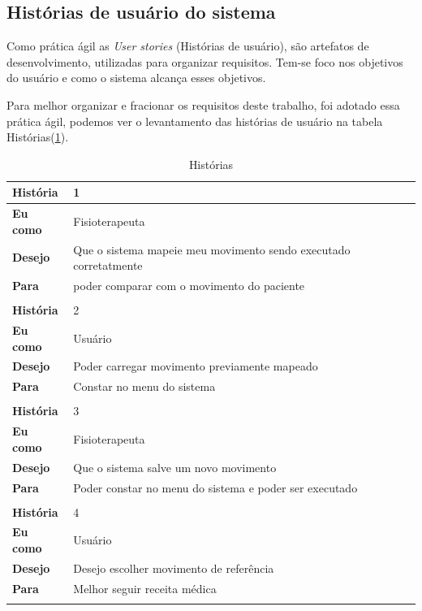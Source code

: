 \subsection{Histórias de usuário do sistema}
\label{sec:Histórias de usuário}
  Como prática ágil as \textit{User stories} (Histórias de usuário), são artefatos
de desenvolvimento, utilizadas para organizar requisitos. Tem-se foco nos objetivos
do usuário e como o sistema alcança esses objetivos.

  Para melhor organizar e fracionar os requisitos deste trabalho, foi adotado
essa prática ágil, podemos ver o levantamento das histórias de usuário na tabela Histórias(\ref{historias}).
\begin{table}[H]
\centering
\caption{Histórias}
\label{historias}
\begin{tabular}{|l|l|}
\hline
\textbf{História} & 1                                                        \\ \hline
\textbf{Eu como}  & Fisioterapeuta                    \\ \hline
\textbf{Desejo}   & Que o sistema mapeie meu movimento sendo executado corretatmente                   \\ \hline
\textbf{Para}     & poder comparar com o movimento do paciente \\ \hline
 \multicolumn{2}{|l|}{}                                                       \\ \hline
\textbf{História} & 2                                                        \\ \hline
\textbf{Eu como}  & Usuário                                    \\ \hline
\textbf{Desejo}   & Poder carregar movimento previamente mapeado                \\ \hline
\textbf{Para}     & Constar no menu do sistema\\ \hline
\multicolumn{2}{|l|}{}                                                       \\ \hline
\textbf{História} & 3                                                        \\ \hline
\textbf{Eu como}  & Fisioterapeuta                    \\ \hline
\textbf{Desejo}   & Que o sistema salve um novo movimento                    \\ \hline
\textbf{Para}     & Poder constar no menu do sistema e poder ser executado \\ \hline
\multicolumn{2}{|l|}{}                                                       \\ \hline
\textbf{História} & 4                                                        \\ \hline
\textbf{Eu como}  & Usuário                                                  \\ \hline
\textbf{Desejo}   & Desejo escolher movimento de referência                  \\ \hline
\textbf{Para}     & Melhor seguir receita médica                             \\ \hline
\multicolumn{2}{|l|}{}                                                       \\ \hline


\end{tabular}
\end{table}
